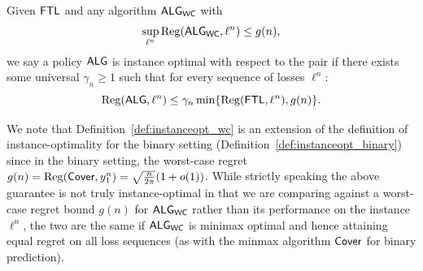 \begin{definition} \label{def:instanceopt_wc}
Given  $\mathsf{FTL}$ 
and any algorithm $\mathsf{ALG}_{\mathsf{WC}}$ with 
\[
\sup_{\ell^n} \mathrm{Reg}(\mathsf{ALG}_{\mathsf{WC}}, \ell^n) \le g(n),
\]
we say a policy $\mathsf{ALG}$ is instance optimal with respect to the pair if there exists some universal $\gamma_n \geq 1$ such that for every sequence of losses $\ell^n$:
\begin{equation}\label{eq:instanceopt_wc}
 \mathrm{Reg}(\mathsf{ALG},\ell^n)\leq \gamma_n \min\{\mathrm{Reg}(\mathsf{FTL},\ell^n),g(n)\}.
\end{equation}
\end{definition}
We note that Definition~\ref{def:instanceopt_wc} is an extension of the definition of instance-optimality for the binary setting (Definition~\ref{def:instanceopt_binary}) since in the binary setting, the worst-case regret $g(n) = \mathrm{Reg}(\mathsf{Cover},y_1^n) = \sqrt{\frac{n}{2\pi}}(1+o(1))$.
While strictly speaking the above guarantee is not truly instance-optimal in that we are comparing against a worst-case regret bound $g(n)$ for $\mathsf{ALG}_{\mathsf{WC}}$ rather than its performance on the instance $\ell^n$, the two are the same if $\mathsf{ALG}_{\mathsf{WC}}$ is minimax optimal and hence attaining equal regret on all loss sequences (as with the minmax algorithm $\mathsf{Cover}$ for binary prediction). 

